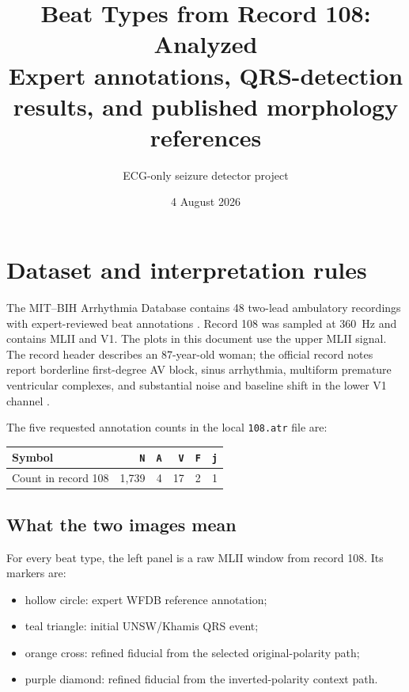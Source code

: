 \documentclass[11pt]{article}
\title{\textbf{Beat Types from Record 108: Analyzed}\\[0.4em]
\large Expert annotations, QRS-detection results, and published morphology references}
\author{ECG-only seizure detector project}
\date{4 August 2026}
\begin{document}
\maketitle

\begin{center}
\end{center}

\section{Dataset and interpretation rules}

The MIT--BIH Arrhythmia Database contains 48 two-lead ambulatory recordings with expert-reviewed beat annotations \cite{goldberger2000physiobank,moody2001mitbih,physionetmitdb}. Record 108 was sampled at 360~Hz and contains MLII and V1. The plots in this document use the upper MLII signal. The record header describes an 87-year-old woman; the official record notes report borderline first-degree AV block, sinus arrhythmia, multiform premature ventricular complexes, and substantial noise and baseline shift in the lower V1 channel \cite{physionetmitdb}.

The five requested annotation counts in the local \texttt{108.atr} file are:

\begin{center}
\begin{tabular}{lrrrrr}
\toprule
Symbol & \texttt{N} & \texttt{A} & \texttt{V} & \texttt{F} & \texttt{j} \\
\midrule
Count in record 108 & 1,739 & 4 & 17 & 2 & 1 \\
\bottomrule
\end{tabular}
\end{center}

\subsection{What the two images mean}

For every beat type, the left panel is a raw MLII window from record 108. Its markers are:
\begin{itemize}
\item hollow circle: expert WFDB reference annotation;
\item teal triangle: initial UNSW/Khamis QRS event;
\item orange cross: refined fiducial from the selected original-polarity path;
\item purple diamond: refined fiducial from the inverted-polarity context path.
\end{itemize}
\end{document}
